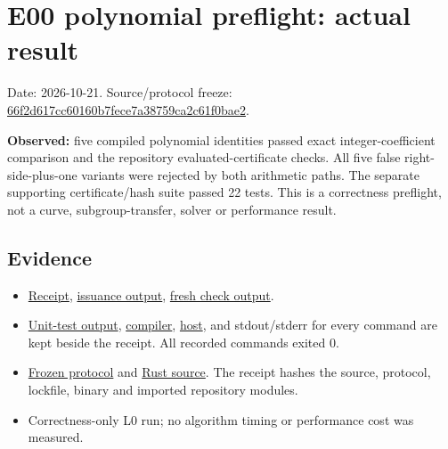 \documentclass[
  10pt,
]{article}
\author{}
\date{}
\providecommand{\tightlist}{%
  \setlength{\itemsep}{0pt}\setlength{\parskip}{0pt}}
\begin{document}
\section{E00 polynomial preflight: actual
result}\label{e00-polynomial-preflight-actual-result}

Date: 2026-10-21. Source/protocol freeze:
\href{https://github.com/aburan28/crypto/commit/66f2d617cc60160b7fece7a38759ca2c61f0bae2}{66f2d617cc60160b7fece7a38759ca2c61f0bae2}.

\textbf{Observed:} five compiled polynomial identities passed exact
integer-coefficient comparison and the repository evaluated-certificate
checks. All five false right-side-plus-one variants were rejected by
both arithmetic paths. The separate supporting certificate/hash suite
passed 22 tests. This is a correctness preflight, not a curve,
subgroup-transfer, solver or performance result.

\subsection{Evidence}\label{evidence}

\begin{itemize}
\tightlist
\item
  \href{run-20261021T144610Z/RECEIPT.json}{Receipt},
  \href{run-20261021T144610Z/issue.json}{issuance output},
  \href{run-20261021T144610Z/check.json}{fresh check output}.
\item
  \href{run-20261021T144610Z/unit-tests.stdout}{Unit-test output},
  \href{run-20261021T144610Z/compiler.txt}{compiler},
  \href{run-20261021T144610Z/host.txt}{host}, and stdout/stderr for
  every command are kept beside the receipt. All recorded commands
  exited 0.
\item
  \href{../E00_PROTOCOL.md}{Frozen protocol} and
  \href{../tools/src/main.rs}{Rust source}. The receipt hashes the
  source, protocol, lockfile, binary and imported repository modules.
\item
  Correctness-only L0 run; no algorithm timing or performance cost was
  measured.
\end{itemize}
\end{document}
